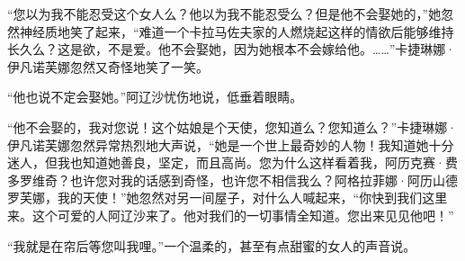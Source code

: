 \par “您以为我不能忍受这个女人么？他以为我不能忍受么？但是他不会娶她的，”她忽然神经质地笑了起来，“难道一个卡拉马佐夫家的人燃烧起这样的情欲后能够维持长久么？这是欲，不是爱。他不会娶她，因为她根本不会嫁给他。……”卡捷琳娜·伊凡诺芙娜忽然又奇怪地笑了一笑。
\par “他也说不定会娶她。”阿辽沙忧伤地说，低垂着眼睛。
\par “他不会娶的，我对您说！这个姑娘是个天使，您知道么？您知道么？”卡捷琳娜·伊凡诺芙娜忽然异常热烈地大声说，“她是一个世上最奇妙的人物！我知道她十分迷人，但我也知道她善良，坚定，而且高尚。您为什么这样看着我，阿历克赛·费多罗维奇？也许您对我的话感到奇怪，也许您不相信我么？阿格拉菲娜·阿历山德罗芙娜，我的天使！”她忽然对另一间屋子，对什么人喊起来，“你快到我们这里来。这个可爱的人阿辽沙来了。他对我们的一切事情全知道。您出来见见他吧！”
\par “我就是在帘后等您叫我哩。”一个温柔的，甚至有点甜蜜的女人的声音说。
